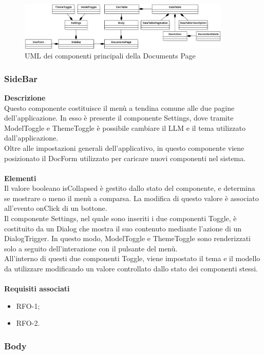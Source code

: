 \begin{figure}[h!]
    \centering  
    \includegraphics[width=0.9\textwidth]{DocumentPageView.png}
    \caption{UML dei componenti principali della Documents Page}
\end{figure}

\subsubsection{SideBar}

\textbf{Descrizione}\\
Questo componente costituisce il menù a tendina comune alle due pagine dell'applicazione. In esso è presente il componente Settings, dove tramite ModelToggle e ThemeToggle è possibile cambiare il LLM e il tema utilizzato dall'applicazione.\\
Oltre alle impostazioni generali dell'applicativo, in questo componente viene posizionato il DocForm utilizzato per caricare nuovi componenti nel sistema.\\ \\
\textbf{Elementi}\\
Il valore booleano isCollapsed è gestito dallo stato del componente, e determina se mostrare o meno il menù a comparsa. La modifica di questo valore è associato all'evento onClick di un bottone.\\
Il componente Settings, nel quale sono inseriti i due componenti Toggle, è costituito da un Dialog che mostra il suo contenuto mediante l'azione di un DialogTrigger. In questo modo, ModelToggle e ThemeToggle sono renderizzati solo a seguito dell'interazione con il pulsante del menù.\\
All'interno di questi due componenti Toggle, viene impostato il tema e il modello da utilizzare modificando un valore controllato dallo stato dei componenti stessi.\\ \\
\textbf{Requisiti associati}
\begin{itemize}
    \item RFO-1;
    \item RFO-2.
\end{itemize}

\subsubsection{Body}

